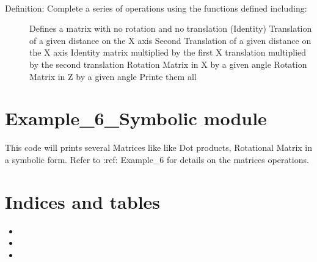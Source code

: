 \documentclass[letterpaper,10pt,english]{sphinxmanual}
\begin{document}

\begin{fulllineitems}
\label{\detokenize{rst/Example_6:Example_6.main}}~\begin{description}
\item[{Definition: Complete a series of operations using the functions defined including:}] \leavevmode
Defines a matrix with no rotation and no translation (Identity)
Translation of a given distance on the X axis
Second Translation of a given distance on the X axis
Identity matrix multiplied by the first X translation multiplied by the second translation
Rotation Matrix in X by a given angle
Rotation Matrix in Z by a given angle
Printe them all

\end{description}

\end{fulllineitems}



\chapter{Example\_6\_Symbolic module}
\label{\detokenize{rst/Example_6_Symbolic:example-6-symbolic-module}}\label{\detokenize{rst/Example_6_Symbolic::doc}}\label{\detokenize{rst/Example_6_Symbolic:module-Example_6_Symbolic}}

\begin{fulllineitems}
\label{\detokenize{rst/Example_6_Symbolic:Example_6_Symbolic.main}}
This code will prints several Matrices like like Dot products, Rotational Matrix in a symbolic form.
Refer to :ref: Example\_6 for details on the matrices operations.

\end{fulllineitems}



\chapter{Indices and tables}
\label{\detokenize{index:indices-and-tables}}\begin{itemize}
\item {} 

\item {} 

\item {} 

\end{itemize}
\end{document}
